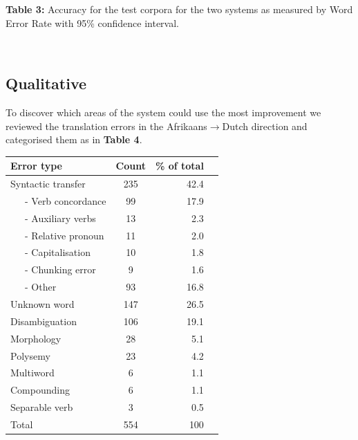 \documentclass[a0,landscape]{a0poster}
\begin{document}
\begin{multicols}{4}
\begin{minipage}[b]{25cm}
\begin{center}
\begin{tabular}{|l|l|r|r|}
   \hline
  \end{tabular}
    
    \label{table:quan}
  \end{center}
	\textbf{Table 3:} Accuracy for the test corpora for the two systems as measured by Word Error Rate 
        with 95\% confidence interval.
\end{minipage}\\

\subsection{Qualitative}
To discover which areas of the system could use the most improvement we reviewed the translation errors
in the Afrikaans$\rightarrow$Dutch direction and categorised them as in {\bf Table 4}. \\
\begin{minipage}[b]{25cm}
  \begin{center}
  \begin{tabular}{|l|c|r|r|}
     \hline
     {\bf Error type}    & {\bf Count} & {\bf \% of total} \\
     \hline
     Syntactic transfer   & 235         & 42.4 \\
     \hline
     ~~~- Verb concordance & 99          & 17.9 \\
     ~~~- Auxiliary verbs & 13          & 2.3 \\ 
     ~~~- Relative pronoun& 11          & 2.0 \\
     ~~~- Capitalisation  & 10          & 1.8 \\
     ~~~- Chunking error  & 9           & 1.6 \\
     ~~~- Other           & 93          & 16.8 \\
     \hline
     Unknown word         & 147         & 26.5 \\
     Disambiguation       & 106         & 19.1 \\
     Morphology           & 28          & 5.1 \\
     Polysemy             & 23          & 4.2 \\
     Multiword            & 6           & 1.1 \\
     Compounding          & 6           & 1.1 \\
     Separable verb       & 3           & 0.5 \\
     \hline
     Total                & 554         & 100 \\
     \hline
  \end{tabular}
    

\end{center}
\end{minipage}
\end{multicols}
\end{document}
